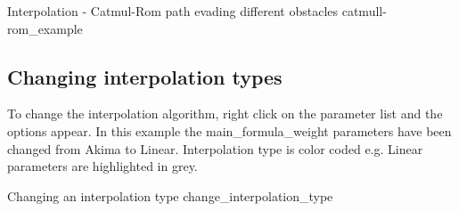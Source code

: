 {Interpolation - Catmul-Rom path evading different obstacles}
{catmull-rom_example}

\subsection{Changing interpolation types}\label{changing-interpolation-types}

To change the interpolation algorithm, right click on the parameter list and the
options appear. In this example the main\_formula\_weight parameters have been
changed from Akima to Linear. Interpolation type is color coded e.g. Linear
parameters are highlighted in grey.

{Changing an interpolation type}
{change_interpolation_type}
